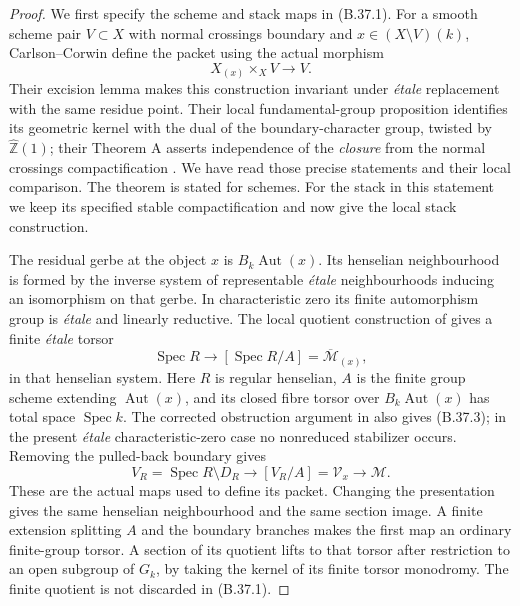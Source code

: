 \begin{proof}
We first specify the scheme and stack maps in (B.37.1).
For a smooth scheme pair $V\subset X$ with normal crossings
boundary and $x\in(X\setminus V)(k)$, Carlson--Corwin define
the packet using the actual morphism
\[
 X_{(x)}\times_X V\longrightarrow V.
 \tag{B.37.2}
\]
Their excision lemma makes this construction invariant under
\emph{\'etale} replacement with the same residue point.
Their local fundamental-group proposition identifies its
geometric kernel with the dual of the boundary-character
group, twisted by $\widehat{\mathbb Z}(1)$; their Theorem A
asserts independence of the \emph{closure} from the normal
crossings compactification \cite{B_CarlsonCorwin}.
We have read those precise statements and their local
comparison. The theorem is stated for schemes. For the
stack in this statement we keep its specified stable
compactification and now give the local stack construction.

The residual gerbe at the object $x$ is
$B_k\operatorname{Aut}(x)$. Its henselian neighbourhood
is formed by the inverse system of representable
\emph{\'etale} neighbourhoods inducing an isomorphism on
that gerbe. In characteristic zero its finite automorphism
group is \emph{\'etale} and linearly reductive. The local
quotient construction of
\cite[Theorem 3.2 and Proposition 3.6, Step 1]{B_AOV}
gives a finite \emph{\'etale} torsor
\[
 \operatorname{Spec}R\longrightarrow
 [\operatorname{Spec}R/A]
       =\overline{\mathcal M}_{(x)},
 \tag{B.37.3}
\]
in that henselian system. Here $R$ is regular henselian,
$A$ is the finite group scheme extending
$\operatorname{Aut}(x)$, and its closed fibre torsor
over $B_k\operatorname{Aut}(x)$ has total space
$\operatorname{Spec}k$. The corrected obstruction argument
in \cite{B_AOVCorrigendum} also gives (B.37.3); in the
present \emph{\'etale} characteristic-zero case no
nonreduced stabilizer occurs. Removing the pulled-back
boundary gives
\[
 V_R=\operatorname{Spec}R\setminus D_R
       \longrightarrow [V_R/A]=\mathcal V_x
       \longrightarrow\mathcal M.
 \tag{B.37.4}
\]
These are the actual maps used to define its packet.
Changing the presentation gives the same henselian
neighbourhood and the same section image. A finite
extension splitting $A$ and the boundary branches makes
the first map an ordinary finite-group torsor. A section
of its quotient lifts to that torsor after restriction to
an open subgroup of $G_k$, by taking the kernel of its
finite torsor monodromy. The finite quotient is not
discarded in (B.37.1).


\end{proof}
